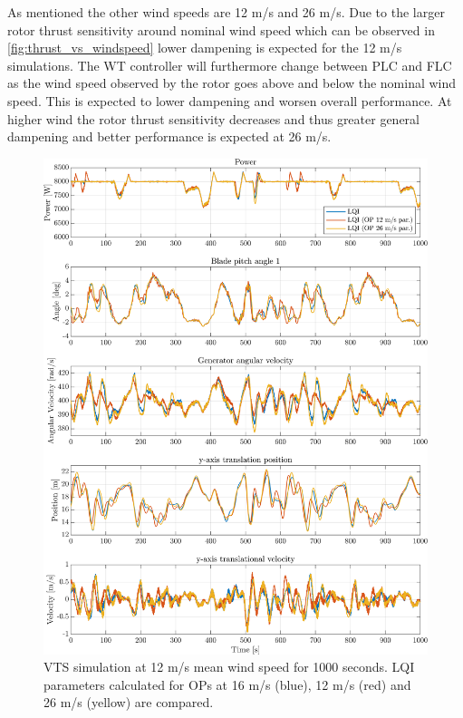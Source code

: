 As mentioned the other wind speeds are 12 m/s and 26 m/s. Due to the larger rotor thrust sensitivity around nominal wind speed which can be observed in \cref{fig:thrust_vs_windspeed} lower dampening is expected for the 12 m/s simulations. The WT controller will furthermore change between PLC and FLC as the wind speed observed by the rotor goes above and below the nominal wind speed. This is expected to lower dampening and worsen overall performance. At higher wind the rotor thrust sensitivity decreases and thus greater general dampening and better performance is expected at 26 m/s.
\begin{figure}[ht]
	\centering
	\includegraphics[width=0.7\linewidth]{Graphics/TestResults/VTSplotting/20_pow_th_w_py_vy.png}
	\caption{VTS simulation at 12 m/s mean wind speed for 1000 seconds. LQI parameters calculated for OPs at 16 m/s (blue), 12 m/s (red) and 26 m/s (yellow) are compared.}
	\label{fig:vts_20_pow_th_w_py_vy}
\end{figure}
